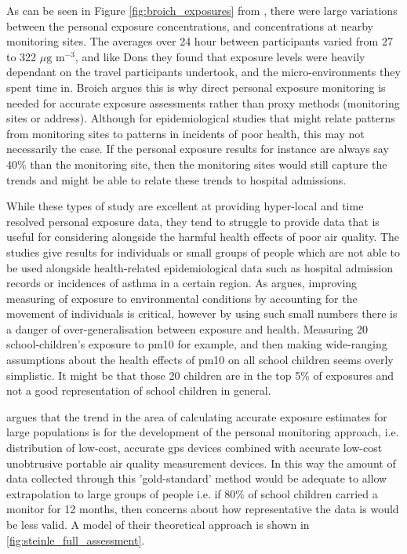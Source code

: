 As can be seen in Figure \ref{fig:broich_exposures} from \cite{Broich2011}, there were large variations between the personal exposure concentrations, and concentrations at nearby monitoring sites. The averages over 24 hour between participants varied from 27 to 322 $\mu \text{g m}^{-3}$, and like Dons they found that exposure levels were heavily dependant on the travel participants undertook, and the micro-environments they spent time in. Broich argues this is why direct personal exposure monitoring is needed for accurate exposure assessments rather than proxy methods (monitoring sites or address). Although for epidemiological studies that might relate patterns from monitoring sites to patterns in incidents of poor health, this may not necessarily the case. If the personal exposure results for instance are always say 40\% than the monitoring site, then the monitoring sites would still capture the trends and might be able to relate these trends to hospital admissions. 

While these types of study are excellent at providing hyper-local and time resolved personal exposure data, they tend to struggle to provide data that is useful for considering alongside the harmful health effects of poor air quality. The studies give results for individuals or small groups of people which are not able to be used alongside health-related epidemiological data such as hospital admission records or incidences of asthma in a certain region. As \cite{Chaix2013} argues, improving measuring of exposure to environmental conditions by accounting for the movement of individuals is critical, however by using such small numbers there is a danger of over-generalisation between exposure and health. Measuring 20 school-children's exposure to \gls{pm10} for example, and then making wide-ranging assumptions about the health effects of \gls{pm10} on all school children seems overly simplistic. It might be that those 20 children are in the top 5\% of exposures and not a good representation of school children in general.

\cite{Steinle2013} argues that the trend in the area of calculating accurate exposure estimates for large populations is for the development of the personal monitoring approach, i.e. distribution of low-cost, accurate \gls{gps} devices combined with accurate low-cost unobtrusive portable air quality measurement devices. In this way the amount of data collected through this 'gold-standard' method would be adequate to allow extrapolation to large groups of people i.e. if 80\% of school children carried a monitor for 12 months, then concerns about how representative the data is would be less valid. A model of their theoretical approach is shown in \ref{fig:steinle_full_assessment}.

